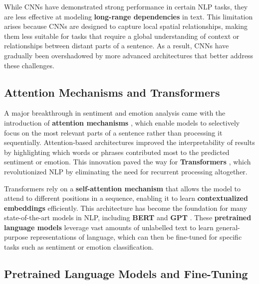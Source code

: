 While CNNs have demonstrated strong performance in certain NLP tasks, they are less effective at modeling \textbf{long-range dependencies} in text. This limitation arises because CNNs are designed to capture local spatial relationships, making them less suitable for tasks that require a global understanding of context or relationships between distant parts of a sentence. As a result, CNNs have gradually been overshadowed by more advanced architectures that better address these challenges.

\subsection*{Attention Mechanisms and Transformers}

A major breakthrough in sentiment and emotion analysis came with the introduction of \textbf{attention mechanisms} \cite{Bahdanau2014NeuralMT}, which enable models to selectively focus on the most relevant parts of a sentence rather than processing it sequentially. Attention-based architectures improved the interpretability of results by highlighting which words or phrases contributed most to the predicted sentiment or emotion. This innovation paved the way for \textbf{Transformers} \cite{vaswani2023attentionneed}, which revolutionized NLP by eliminating the need for recurrent processing altogether.
\newline

Transformers rely on a \textbf{self-attention mechanism} that allows the model to attend to different positions in a sequence, enabling it to learn \textbf{contextualized embeddings} efficiently. This architecture has become the foundation for many state-of-the-art models in NLP, including \textbf{BERT} \cite{DBLP:journals/corr/abs-1810-04805} and \textbf{GPT} \cite{Radford2018ImprovingLU}. These \textbf{pretrained language models} leverage vast amounts of unlabelled text to learn general-purpose representations of language, which can then be fine-tuned for specific tasks such as sentiment or emotion classification.

\subsection*{Pretrained Language Models and Fine-Tuning}

